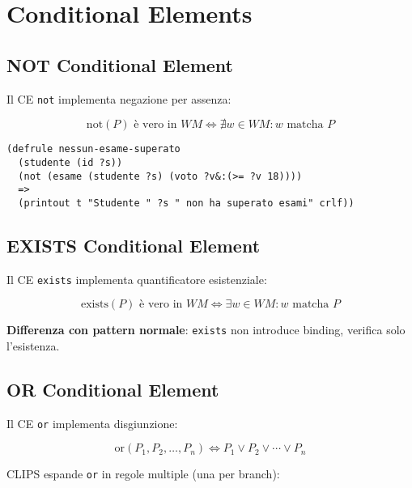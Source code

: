 \section{Conditional Elements}

\subsection{NOT Conditional Element}

Il CE \texttt{not} implementa negazione per assenza:

\begin{equation}
\text{not}(P) \text{ è vero in } WM \Leftrightarrow \nexists w \in WM: w \text{ matcha } P
\end{equation}

\begin{esempio}
\begin{lstlisting}[language=CLIPS]
(defrule nessun-esame-superato
  (studente (id ?s))
  (not (esame (studente ?s) (voto ?v&:(>= ?v 18))))
  =>
  (printout t "Studente " ?s " non ha superato esami" crlf))
\end{lstlisting}
\end{esempio}

\subsection{EXISTS Conditional Element}

Il CE \texttt{exists} implementa quantificatore esistenziale:

\begin{equation}
\text{exists}(P) \text{ è vero in } WM \Leftrightarrow \exists w \in WM: w \text{ matcha } P
\end{equation}

\textbf{Differenza con pattern normale}: \texttt{exists} non introduce binding, verifica solo l'esistenza.

\subsection{OR Conditional Element}

Il CE \texttt{or} implementa disgiunzione:

\begin{equation}
\text{or}(P_1, P_2, \ldots, P_n) \Leftrightarrow P_1 \lor P_2 \lor \cdots \lor P_n
\end{equation}

CLIPS espande \texttt{or} in regole multiple (una per branch):

